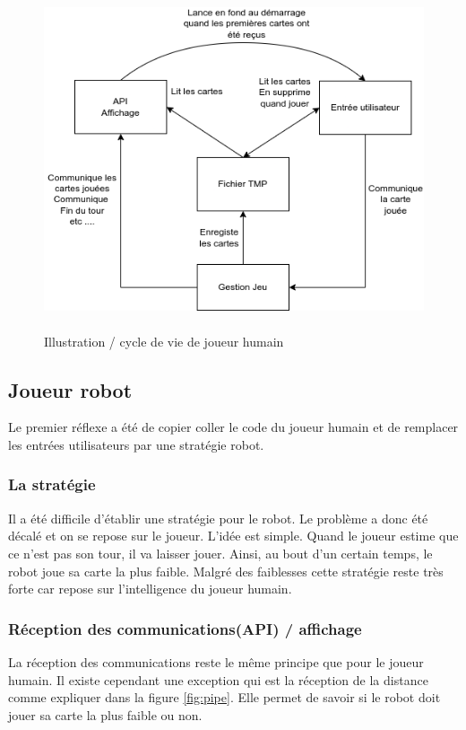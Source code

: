 \documentclass{article}
\begin{document}
\begin{figure}[!htb]
	\centering
    	\includegraphics[height=10cm]{./assets/JoueurHumain.png}
    	\caption{Illustration / cycle de vie de joueur humain}
\end{figure}

\newpage

\subsection{Joueur robot}
Le premier réflexe a été de copier coller le code du joueur humain et de remplacer les entrées utilisateurs par une stratégie robot. 

\subsubsection{La stratégie}
Il a été difficile d'établir une stratégie pour le robot. Le problème a donc été décalé et on se repose sur le joueur. L'idée est simple. Quand le joueur estime que ce n'est pas son tour, il va laisser jouer. Ainsi, au bout d'un certain temps, le robot joue sa carte la plus faible. Malgré des faiblesses cette stratégie reste très forte car repose sur l'intelligence du joueur humain. 

\subsubsection{Réception des communications(API) / affichage}
La réception des communications reste le même principe que pour le joueur humain. Il existe cependant une exception qui est la réception de la distance comme expliquer dans la figure \ref{fig:pipe}. Elle permet de savoir si le robot doit jouer sa carte la plus faible ou non. 
\end{document}
